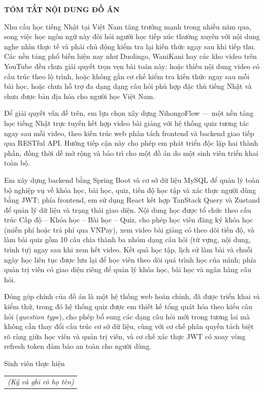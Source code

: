 \documentclass[../DoAn.tex]{subfiles}
\begin{document}
\begin{center}
    \Large{\textbf{TÓM TẮT NỘI DUNG ĐỒ ÁN}}\\
\end{center}
\vspace{1cm}
Nhu cầu học tiếng Nhật tại Việt Nam tăng trưởng mạnh trong nhiều năm qua, song việc học ngôn ngữ này đòi hỏi người học tiếp xúc thường xuyên với nội dung nghe nhìn thực tế và phải chủ động kiểm tra lại kiến thức ngay sau khi tiếp thu. Các nền tảng phổ biến hiện nay như Duolingo, WaniKani hay các kho video trên YouTube đều chưa giải quyết trọn vẹn bài toán này: hoặc thiếu nội dung video có cấu trúc theo lộ trình, hoặc không gắn cơ chế kiểm tra kiến thức ngay sau mỗi bài học, hoặc chưa hỗ trợ đa dạng dạng câu hỏi phù hợp đặc thù tiếng Nhật và chưa được bản địa hóa cho người học Việt Nam.

Để giải quyết vấn đề trên, em lựa chọn xây dựng NihongoFlow — một nền tảng học tiếng Nhật trực tuyến kết hợp video bài giảng với hệ thống quiz tương tác ngay sau mỗi video, theo kiến trúc web phân tách frontend và backend giao tiếp qua RESTful API. Hướng tiếp cận này cho phép em phát triển độc lập hai thành phần, đồng thời dễ mở rộng và bảo trì cho một đồ án do một sinh viên triển khai toàn bộ.

Em xây dựng backend bằng Spring Boot và cơ sở dữ liệu MySQL để quản lý toàn bộ nghiệp vụ về khóa học, bài học, quiz, tiến độ học tập và xác thực người dùng bằng JWT; phía frontend, em sử dụng React kết hợp TanStack Query và Zustand để quản lý dữ liệu và trạng thái giao diện. Nội dung học được tổ chức theo cấu trúc Cấp độ -- Khóa học -- Bài học -- Quiz, cho phép học viên đăng ký khóa học (miễn phí hoặc trả phí qua VNPay), xem video bài giảng có theo dõi tiến độ, và làm bài quiz gồm 10 câu chia thành ba nhóm dạng câu hỏi (từ vựng, nội dung, trình tự) ngay sau khi xem hết video. Kết quả học tập, lịch sử làm bài và chuỗi ngày học liên tục được lưu lại để học viên theo dõi quá trình học của mình; phía quản trị viên có giao diện riêng để quản lý khóa học, bài học và ngân hàng câu hỏi.

Đóng góp chính của đồ án là một hệ thống web hoàn chỉnh, đã được triển khai và kiểm thử, trong đó hệ thống quiz được em thiết kế tổng quát hóa theo kiểu câu hỏi (\textit{question type}), cho phép bổ sung các dạng câu hỏi mới trong tương lai mà không cần thay đổi cấu trúc cơ sở dữ liệu, cùng với cơ chế phân quyền tách biệt rõ ràng giữa học viên và quản trị viên, và cơ chế xác thực JWT có xoay vòng refresh token đảm bảo an toàn cho người dùng.
\begin{flushright}
Sinh viên thực hiện\\
\begin{tabular}{@{}c@{}}
\textit{(Ký và ghi rõ họ tên)}
\end{tabular}
\end{flushright}
\end{document}
